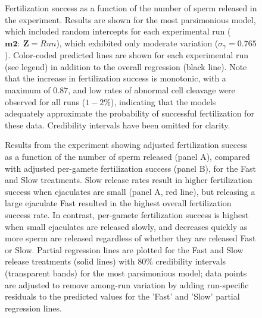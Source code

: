 \documentclass{article}
\begin{document}
\begin{figure}[!ht]
\centering
\caption{Fertilization success as a function of the number of sperm released in the  experiment. Results are shown for the most parsimonious model, which included random intercepts for each experimental run ($\mathbf{m2}:~\mathbf{Z} = Run$), which exhibited only moderate variation ($\sigma_{\gamma} = 0.765$). Color-coded predicted lines are shown for each experimental run (see legend) in addition to the overall regression (black line). Note that the increase in fertilization success is monotonic, with a maximum of $0.87$, and low rates of abnormal cell cleavage were observed for all runs ($1-2\%$), indicating that the models adequately approximate the probability of successful fertilization for these data. Credibility intervals have been omitted for clarity.}
\label{fig:fertPlots}
\end{figure}
\newpage{}


\begin{figure}[!ht] 
\centering
\caption{Results from the  experiment showing adjusted fertilization success as a function of the number of sperm released (panel A), compared with adjusted per-gamete fertilization success (panel B), for the Fast and Slow treatments. Slow release rates result in higher fertilization success when ejaculates are small (panel A, red line), but releasing a large ejaculate Fast resulted in the highest overall fertilization success rate. In contrast, per-gamete fertilization success is highest when small ejaculates are released slowly, and decreases quickly as more sperm are released regardless of whether they are released Fast or Slow. Partial regression lines are plotted for the Fast and Slow release treatments (solid lines) with $80\%$ credibility intervals (transparent bands) for the most parsimonious model; data points are adjusted to remove among-run variation by adding run-specific residuals to the predicted values for the 'Fast' and 'Slow' partial regression lines.}
\label{fig:perGamete}
\end{figure}

\FloatBarrier

\newpage{}






\end{document}
